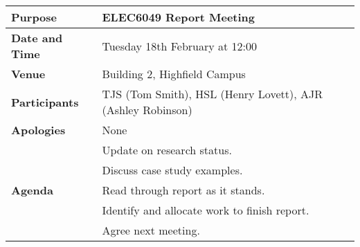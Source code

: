 \begin{center}
\begin{longtable}{| m{} | m{} |} \hline
\textbf{Purpose} & ELEC6049 Report Meeting \\ \hline
\textbf{Date and Time} & Tuesday 18th February at 12:00 \\ \hline
\textbf{Venue} & Building 2, Highfield Campus \\ \hline
\textbf{Participants} & TJS (Tom Smith), HSL (Henry Lovett), AJR (Ashley Robinson)\\ \hline
\textbf{Apologies} & None \\ \hline
\multirow{5}{*}{\textbf{Agenda}} & Update on research status. \\
 & Discuss case study examples. \\ 
 & Read through report as it stands. \\
 & Identify and allocate work to finish report. \\ 
 & Agree next meeting. \\ \hline
\end{longtable}
\end{center}

